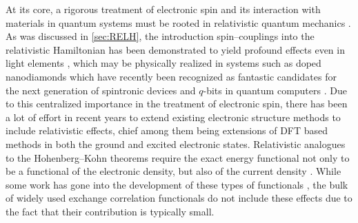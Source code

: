 At its core, a rigorous treatment of electronic spin and its interaction with
materials in quantum systems must be rooted in relativistic quantum mechanics
\cite{Dreizler84_353,Faegri07_book,Pyykko12_45,Wolf15_book}. 
As was discussed in \cref{sec:RELH}, the introduction
spin--couplings into the relativistic Hamiltonian has been demonstrated to yield profound
effects even in light elements \cite{Pyykko12_45}, which may be physically
realized in systems such as doped nanodiamonds which have recently been
recognized as  fantastic candidates for the next generation of spintronic
devices and $q$-bits in quantum
computers \cite{Proskuryakov12_226402,Gali17_081115,Awschalom10_8513,Obrien10_7285,Petta13_1174,Li16_165402}.
Due to this centralized importance in the treatment of electronic spin, there
has been a lot of effort in recent years to extend existing electronic
structure methods to include relativistic effects, chief among them being
extensions of DFT based methods in both the
ground \cite{Helgaker02_814,Liu03_597,Cheng07_104106,Saue11_1439} and
excited \cite{Jensen03_522,Liu04_6658,Saue09_2091,Li16_5379,Li17_2591}
electronic states.  
Relativistic analogues to the Hohenberg--Kohn
theorems require the exact energy functional not only to be a functional of the
electronic density, but also of the current
density \cite{Vignale95_485,Engel98_138,Faegri07_book,Ullrich04_20,Rajagopal96_book,Wolf15_book,Rasolt87_2360,Boeij07_174111,Gross07_100401,Gross08_245106}.
While some work has gone into the development of these types of
functionals \cite{Tozer08_074101,Colwell95_10095,Sandratskii98_91,Ullrich09_859,Gross13_156401,Furche12_164105,Teale15_4169},
the bulk of widely used exchange correlation functionals do not include these
effects due to the fact that their contribution is typically small. 


